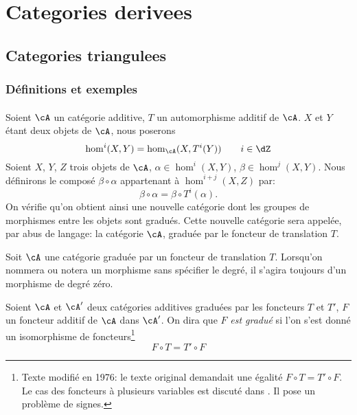 
\chapter{Categories derivees}\label{VIII}










\section{Categories triangulees}\label{VIII:1}





\subsection{D\'efinitions et exemples}\label{VIII:1-1}





\addtocounter{subsubsection}{-1}
\subsubsection{}\label{VIII:1-1-0}

Soient $\cA$ un cat\'egorie additive, $T$ un automorphisme additif de $\cA$. 
$X$ et $Y$ \'etant deux objets de $\cA$, nous poserons 
\[
  \hom^i(X,Y) = \hom_\cA(X,T^i(Y)) \qquad i\in \dZ 
\]
Soient $X$, $Y$, $Z$ trois objets de $\cA$, $\alpha\in \hom^i(X,Y)$, 
$\beta\in \hom^j(X,Y)$. Nous d\'efinirons le compos\'e $\beta\circ\alpha$ 
appartenant \`a $\hom^{i+j}(X,Z)$ par: 
\[
  \beta\circ \alpha = \beta\circ T^i(\alpha) \text{.}
\]
On v\'erifie qu'on obtient ainsi une nouvelle cat\'egorie dont les groupes de 
morphismes entre les objets sont gradu\'es. Cette nouvelle cat\'egorie sera 
appel\'ee, par abus de langage: la cat\'egorie $\cA$, gradu\'ee par le foncteur 
de translation $T$. 

Soit $\cA$ une cat\'egorie gradu\'ee par un foncteur de translation $T$. 
Lorsqu'on nommera ou notera un morphisme sans sp\'ecifier le degr\'e, il 
s'agira toujours d'un morphisme de degr\'e z\'ero. 

Soient $\cA$ et $\cA'$ deux cat\'egories additives gradu\'ees par les foncteurs
$T$ et $T'$, $F$ un foncteur additif de $\cA$ dans $\cA'$. On dira que $F$ 
\emph{est gradu\'e} si l'on s'est donn\'e un isomorphisme de 
foncteurs\footnote{Texte modifi\'e en 1976: le texte original demandait une 
\'egalit\'e $F\circ T=T'\circ F$. Le cas des foncteurs \`a plusieurs variables 
est discut\'e dans \cite[XVIII 0.2]{sga4}. Il pose un probl\`eme de signes.} 
\[
  F\circ T = T'\circ F 
\]

